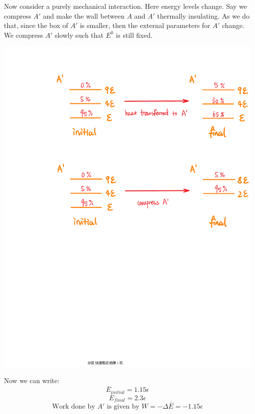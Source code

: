\documentclass[11pt]{article}
\theoremstyle{break}
\theoremstyle{break}
\begin{document}
Now consider a purely mechanical interaction. Here energy levels change. Say we compress $A'$ and make the wall between $A$ and $A'$ thermally insulating. As we do that, since the box of $A'$ is smaller, then the external parameters for $A'$ change. We compress $A'$ slowly such that $E^0$ is still fixed. 
\begin{center}
\includegraphics[scale=0.5]{mechanicalInteraction.pdf}
\end{center}
Now we can write:
$$\bar{E}_{initial} = 1.15\epsilon$$
$$\bar{E}_{final} = 2.3\epsilon$$
$$\text{Work done by }A' \text{ is given by }W = -\Delta \bar{E} = -1.15\epsilon$$
\end{document}
